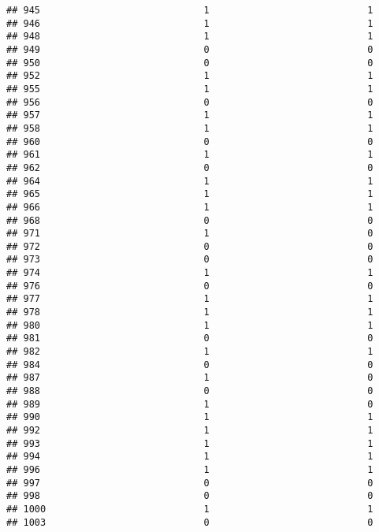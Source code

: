 \documentclass[
]{article}
\begin{document}
\begin{verbatim}
## 945                             1                            1
## 946                             1                            1
## 948                             1                            1
## 949                             0                            0
## 950                             0                            0
## 952                             1                            1
## 955                             1                            1
## 956                             0                            0
## 957                             1                            1
## 958                             1                            1
## 960                             0                            0
## 961                             1                            1
## 962                             0                            0
## 964                             1                            1
## 965                             1                            1
## 966                             1                            1
## 968                             0                            0
## 971                             1                            0
## 972                             0                            0
## 973                             0                            0
## 974                             1                            1
## 976                             0                            0
## 977                             1                            1
## 978                             1                            1
## 980                             1                            1
## 981                             0                            0
## 982                             1                            1
## 984                             0                            0
## 987                             1                            0
## 988                             0                            0
## 989                             1                            0
## 990                             1                            1
## 992                             1                            1
## 993                             1                            1
## 994                             1                            1
## 996                             1                            1
## 997                             0                            0
## 998                             0                            0
## 1000                            1                            1
## 1003                            0                            0

\end{verbatim}
\end{document}
